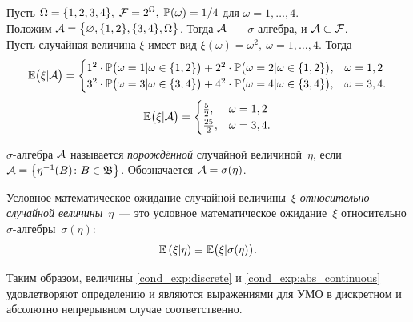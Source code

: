     \vspace{5mm}
    \begin{exmp}
        Пусть $\Omega = \{1, 2, 3, 4\}, \; \mathcal{F} = 2^{\Omega}, \; \operatorname{\mathbb{P}}(\omega) = 1/4$ для $\omega = 1, \ldots, 4$. \\
        Положим $\mathcal{A} = \bigl\{ \varnothing, \{1, 2\}, \{3, 4\}, \Omega \bigr\}$. 
        Тогда $\mathcal{A}$~--- $\sigma$-алгебра, и $\mathcal{A} \subset \mathcal{F}$. \\
        Пусть случайная величина $\xi$ имеет вид $\xi(\omega) = \omega^2, \: \omega = 1, \ldots, 4$.
        Тогда 
        \begin{equation*}
            \operatorname{\mathbb{E}} \bigl( \xi | \mathcal{A} \bigr) = \begin{cases}
                1^2 \cdot \operatorname{\mathbb{P}}\bigl(\omega = 1 | \omega \in \{1, 2\}\bigr) + 2^2 \cdot \operatorname{\mathbb{P}}\bigl(\omega = 2 | \omega \in \{1, 2\}\bigr), & \omega = 1, 2\\
                3^2 \cdot \operatorname{\mathbb{P}}\bigl(\omega = 3 | \omega \in \{3, 4\}\bigr) + 4^2 \cdot \operatorname{\mathbb{P}}\bigl(\omega = 4 | \omega \in \{3, 4\}\bigr), & \omega = 3, 4.
            \end{cases}
        \end{equation*}
        \begin{equation*}
            \operatorname{\mathbb{E}} \bigl( \xi | \mathcal{A} \bigr) = \begin{cases}
                \frac{5}{2}, & \omega = 1, 2\\
                \frac{25}{2}, & \omega = 3, 4.
            \end{cases}
        \end{equation*}
        
    \end{exmp}

    \vspace{5mm}
    \begin{defn}
        $\sigma$-алгебра $\mathcal{A}$ называется \textit{порождённой} случайной величиной~$\eta$, если $\mathcal{A} = \bigl\{ \eta^{-1}(B)\colon B \in \mathfrak{B} \bigr\} $.
        Обозначается $\mathcal{A} = \sigma(\eta)$.
    \end{defn}

    \begin{defn}
        Условное математическое ожидание случайной величины~$\xi$ \textit{относительно случайной величины}~$\eta$~--- 
        это условное математическое ожидание~$\xi$ относительно $\sigma$-алгебры~$\sigma(\eta)$:
        \begin{equation*}
            \operatorname{\mathbb{E}} \left( \xi | \eta \right) \equiv \operatorname{\mathbb{E}} \bigl( \xi | \sigma(\eta) \bigr).
        \end{equation*}
    \end{defn}
    Таким образом, величины \eqref{cond_exp:discrete} и \eqref{cond_exp:abs_continuous} удовлетворяют определению и являются выражениями для УМО в дискретном и абсолютно непрерывном случае соответственно.

